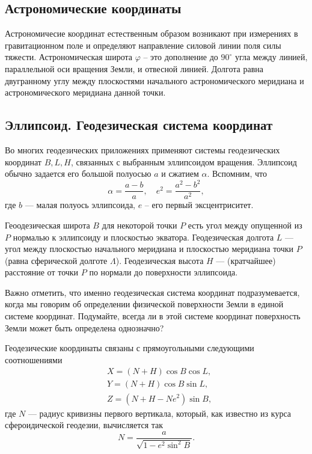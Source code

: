 \documentclass[11pt, a4paper]{article}
\theoremstyle{plain}
\theoremstyle{definition}
\theoremstyle{remark}
\renewcommand{\phi}{\ensuremath{\varphi}}
\begin{document}
\subsection{Астрономические  координаты}
Астрономичесие координат естественным образом возникают при измерениях в гравитационном поле и
определяют направление силовой линии поля силы тяжести.
Астрономическая широта $\phi$ -- это дополнение до $90^\circ$ угла между линией, параллельной оси
вращения Земли, и отвесной линией. Долгота равна двугранному углу между плоскостями начального
астрономического меридиана и астрономического меридиана данной точки.

\subsection{Эллипсоид. Геодезическая система координат}

Во многих геодезических приложениях применяют системы геодезических координат $B, L, H$, 
связанных с выбранным
эллипсоидом вращения. Эллипсоид обычно задается его большой полуосью $a$ и сжатием $\alpha$.
Вспомним, что 
\begin{equation*}
    \alpha = \frac{a - b}{a},\quad e^2 = \frac{a^2 - b^2}{a^2},
\end{equation*}
где $b$ --- малая полуось эллипсоида, $e$ -- его первый эксцентриситет. 

Геоодезическая широта $B$ для некоторой точки $P$ есть угол между опущенной из $P$ нормалью к эллипсоиду и плоскостью
экватора. Геодезическая долгота $L$ --- угол между плоскостью начального меридиана и плоскостью
меридиана точки $P$ (равна сферической долготе $\Lambda$). Геодезическая высота $H$ --- (кратчайшее) 
расстояние от точки $P$ по нормали до поверхности эллипсоида.

Важно отметить, что именно геодезическая система координат подразумевается, когда мы говорим
об определении физической поверхности Земли в единой системе координат. Подумайте, всегда ли в этой
системе координат поверхность Земли может быть определена однозначно?

Геодезические координаты связаны с прямоугольными следующими соотношениями
\begin{align*}
    &X = \left( N + H \right)\cos{B}\cos{L},\\
    &Y = \left( N + H \right)\cos{B}\sin{L},\\
    &Z = \left( N + H - Ne^2 \right)\sin{B},
\end{align*}
где $N$ --- радиус кривизны первого вертикала, который, как известно из курса сфероидической
геодезии, вычисляется так
\begin{equation*}
    N = \frac{a}{\sqrt{1 - e^2\sin^2{B}}}.
\end{equation*}
\end{document}
